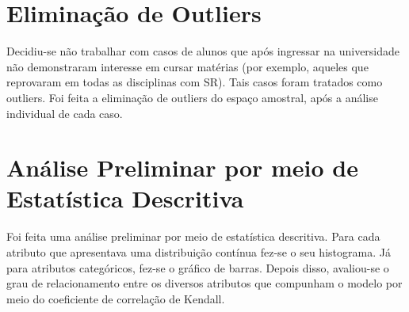 \section{Eliminação de Outliers}
Decidiu-se não trabalhar com casos de alunos que após ingressar na universidade não
demonstraram interesse em cursar matérias (por exemplo, aqueles que reprovaram em
todas as disciplinas com SR). Tais casos foram tratados como outliers.
Foi feita a eliminação de outliers do espaço amostral, após a análise individual de
cada caso. 

\section{Análise Preliminar por meio de Estatística Descritiva}
Foi feita uma análise preliminar por meio de estatística descritiva. Para cada 
atributo que apresentava uma distribuição contínua fez-se o seu histograma.
Já para atributos categóricos, fez-se o gráfico de barras. Depois disso, avaliou-se o
grau de relacionamento entre os diversos atributos que compunham o modelo por meio do
coeficiente de correlação de Kendall. 
